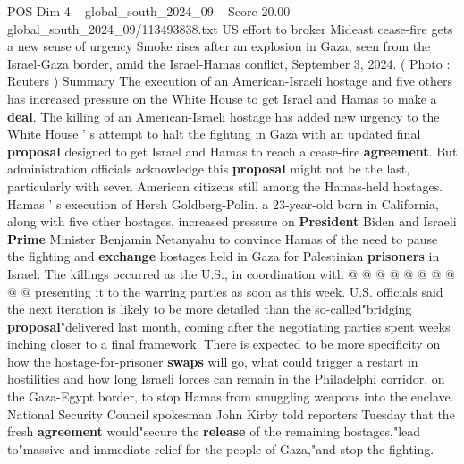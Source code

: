 \begin{textsample}{POS Dim 4 – global\_south\_2024\_09 – Score 20.00 – global\_south\_2024\_09/113493838.txt}  \label{ex:f4_pos_275}
US effort to broker Mideast cease-fire gets a new sense of urgency Smoke rises after an explosion in Gaza, seen from the Israel-Gaza border, amid the Israel-Hamas conflict, September 3, 2024. ( Photo : Reuters ) Summary The execution of an American-Israeli hostage and five others has increased pressure on the White House to get Israel and Hamas to make a \textbf{deal}.
The killing of an American-Israeli hostage has added new urgency to the White House ' s attempt to halt the fighting in Gaza with an updated final \textbf{proposal} designed to get Israel and Hamas to reach a cease-fire \textbf{agreement}.
But administration officials acknowledge this \textbf{proposal} might not be the last, particularly with seven American citizens still among the Hamas-held hostages.
Hamas ' s execution of Hersh Goldberg-Polin, a 23-year-old born in California, along with five other hostages, increased pressure on \textbf{President} Biden and Israeli \textbf{Prime} Minister Benjamin Netanyahu to convince Hamas of the need to pause the fighting and \textbf{exchange} hostages held in Gaza for Palestinian \textbf{prisoners} in Israel.
The killings occurred as the U.S., in coordination with @ @ @ @ @ @ @ @ @ @ presenting it to the warring parties as soon as this week.
U.S. officials said the next iteration is likely to be more detailed than the so-called"bridging \textbf{proposal}"delivered last month, coming after the negotiating parties spent weeks inching closer to a final framework.
There is expected to be more specificity on how the hostage-for-prisoner \textbf{swaps} will go, what could trigger a restart in hostilities and how long Israeli forces can remain in the Philadelphi corridor, on the Gaza-Egypt border, to stop Hamas from smuggling weapons into the enclave.
National Security Council spokesman John Kirby told reporters Tuesday that the fresh \textbf{agreement} would"secure the \textbf{release} of the remaining hostages,"lead to"massive and immediate relief for the people of Gaza,"and stop the fighting.

\end{textsample}
